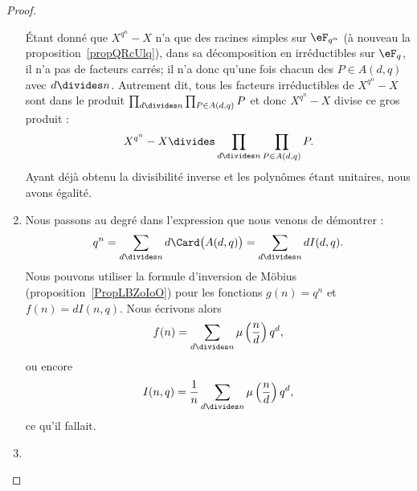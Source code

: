 \begin{proof}
\begin{enumerate}
            Étant donné que \( X^{q^n}-X\) n'a que des racines simples sur \( \eF_{q^n}\) (à nouveau la proposition~\ref{propQRcUlq}), dans sa décomposition en irréductibles sur \( \eF_q\), il n'a pas de facteurs carrés; il n'a donc qu'une fois chacun des \( P\in A(d,q)\) avec \( d\divides n\). Autrement dit, tous les facteurs irréductibles de \( X^{q^n}-X\) sont dans le produit \( \prod_{d\divides n}\prod_{P\in A(d,q)}P\) et donc \( X^{q^n}-X\) divise ce gros produit :
            \begin{equation}
                X^{q^n}-X\divides \prod_{d\divides n}\prod_{P\in A(d,q)}P.
            \end{equation}
            Ayant déjà obtenu la divisibilité inverse et les polynômes étant unitaires, nous avons égalité.

        \item

            Nous passons au degré dans l'expression que nous venons de démontrer :
            \begin{equation}
                q^n=\sum_{d\divides n}d\Card\big( A(d,q) \big)=\sum_{d\divides n}dI(d,q).
            \end{equation}
            Nous pouvons utiliser la formule d'inversion de Möbius (proposition~\ref{PropLBZoIoO}) pour les fonctions \( g(n)=q^n\) et \( f(n)=dI(n,q)\). Nous écrivons alors
            \begin{equation}
                f(n)=\sum_{d\divides n}\mu\left( \frac{ n }{ d } \right)q^d,
            \end{equation}
            ou encore
            \begin{equation}
                I(n,q)=\frac{1}{ n }\sum_{d\divides n}\mu\left( \frac{ n }{ d } \right)q^d,
            \end{equation}
            ce qu'il fallait.

        \item


\end{enumerate}
\end{proof}
